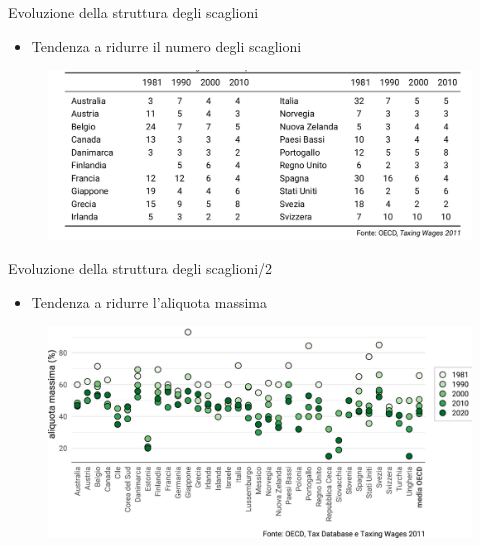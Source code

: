 \documentclass[aspectratio=64,11pt]{beamer}
\newcommand\€{\,\text{€}}
\begin{document}
\begin{frame}{Evoluzione della struttura degli scaglioni}
\begin{itemize}
\item Tendenza a ridurre il numero degli scaglioni
\end{itemize}

\begin{figure}
\centering
\includegraphics[width=\linewidth]{./figure/evoluzione-numero-scaglioni.png}
\end{figure}
\end{frame}


\begin{frame}{Evoluzione della struttura degli scaglioni/2}
\begin{itemize}
\item Tendenza a ridurre l'aliquota massima
\end{itemize}

\begin{figure}
\centering
\includegraphics[width=\linewidth]{./figure/top-rates-OCSE-color.pdf}
\end{figure}
\end{frame}
\end{document}
